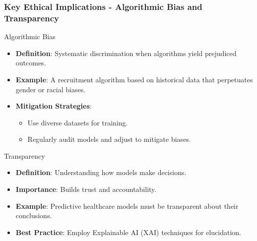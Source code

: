 \documentclass{beamer}
\begin{document}
\begin{frame}[fragile]
    \frametitle{Key Ethical Implications - Algorithmic Bias and Transparency}
    
    \begin{block}{Algorithmic Bias}
        \begin{itemize}
            \item \textbf{Definition}: Systematic discrimination when algorithms yield prejudiced outcomes.
            \item \textbf{Example}: A recruitment algorithm based on historical data that perpetuates gender or racial biases.
            \item \textbf{Mitigation Strategies}:
            \begin{itemize}
                \item Use diverse datasets for training.
                \item Regularly audit models and adjust to mitigate biases.
            \end{itemize}
        \end{itemize}
    \end{block}
    
    \begin{block}{Transparency}
        \begin{itemize}
            \item \textbf{Definition}: Understanding how models make decisions.
            \item \textbf{Importance}: Builds trust and accountability.
            \item \textbf{Example}: Predictive healthcare models must be transparent about their conclusions.
            \item \textbf{Best Practice}: Employ Explainable AI (XAI) techniques for elucidation.
        \end{itemize}
    \end{block}
\end{frame}
\end{document}
